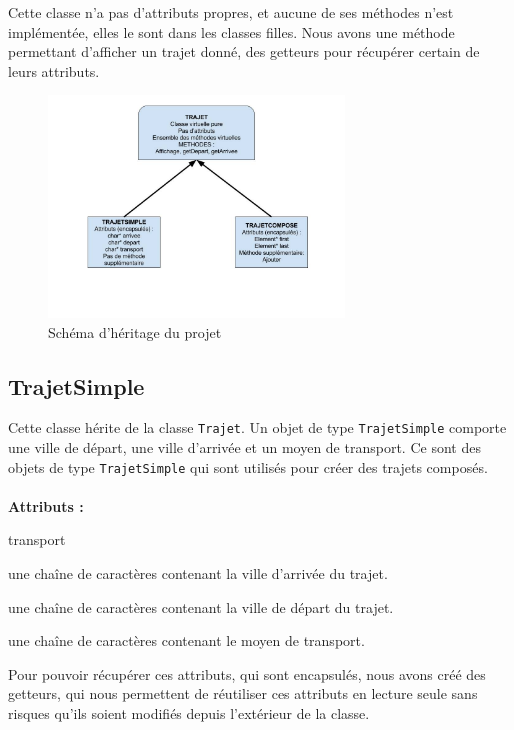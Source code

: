 \documentclass[11pt, a4paper]{article}
\begin{document}
Cette classe n'a pas d'attributs propres, et aucune de ses méthodes n'est implémentée, elles le sont
dans les classes filles. Nous avons une méthode permettant d'afficher un trajet donné, des getteurs
pour récupérer certain de leurs attributs.
\begin{figure}[H]
    \centering
    \includegraphics[trim = 30mm 45mm 30mm 0mm, clip, width = 0.7\textwidth]{Heritage}
    \caption{Schéma d'héritage du projet\label{fig:her}}
\end{figure}

\subsection{TrajetSimple}
Cette classe hérite de la classe \texttt{Trajet}. Un objet de type \texttt{TrajetSimple} comporte
une ville de départ, une ville d'arrivée et un moyen de transport. Ce sont des objets de type
\texttt{TrajetSimple} qui sont utilisés pour créer des trajets composés.\\
\\
\textbf{Attributs : }
\begin{labeling}{transport}
\item [arrivee] une chaîne de caractères contenant la ville d'arrivée du trajet.
\item [depart] une chaîne de caractères contenant la ville de départ du trajet.
\item [transport] une chaîne de caractères contenant le moyen de transport.
\end{labeling}
Pour pouvoir récupérer ces attributs, qui sont encapsulés, nous avons créé des getteurs, qui
nous permettent de réutiliser ces attributs en lecture seule sans risques qu'ils soient modifiés
depuis l'extérieur de la classe.
\end{document}
